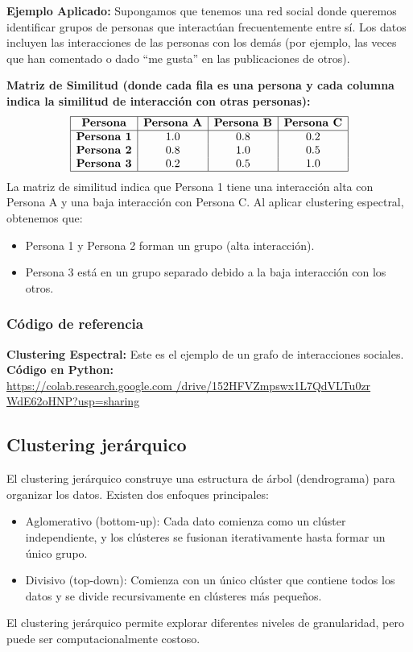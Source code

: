 \documentclass[12pt]{book}
\begin{document}
	\textbf{Ejemplo Aplicado:}
	Supongamos que tenemos una red social donde queremos identificar grupos de personas que interactúan frecuentemente entre sí. Los datos incluyen las interacciones de las personas con los demás (por ejemplo, las veces que han comentado o dado “me gusta” en las publicaciones de otros).
	
	\textbf{Matriz de Similitud (donde cada fila es una persona y cada columna indica la similitud de interacción con otras personas):}
	\[
	\begin{array}{|c|c|c|c|}
		\hline
		\textbf{Persona} & \textbf{Persona A} & \textbf{Persona B} & \textbf{Persona C} \\
		\hline
		\textbf{Persona 1} & 1.0 & 0.8 & 0.2 \\
		\textbf{Persona 2} & 0.8 & 1.0 & 0.5 \\
		\textbf{Persona 3} & 0.2 & 0.5 & 1.0 \\
		\hline
	\end{array}
	\]
	La matriz de similitud indica que Persona 1 tiene una interacción alta con Persona A y una baja interacción con Persona C. Al aplicar clustering espectral, obtenemos que:
	\begin{itemize}
		\item Persona 1 y Persona 2 forman un grupo (alta interacción).
		\item Persona 3 está en un grupo separado debido a la baja interacción con los otros.
	\end{itemize}
	\subsubsection*{Código de referencia}
	\textbf{Clustering Espectral:} Este es el ejemplo de un grafo de interacciones sociales. \\
	\textbf{Código en Python:} \\ \url{https://colab.research.google.com
		/drive/152HFVZmpswx1L7QdVLTu0zr
		WdE62oHNP?usp=sharing}
	
	\subsection{Clustering jerárquico}
	El clustering jerárquico construye una estructura de árbol (dendrograma) para organizar los datos. Existen dos enfoques principales: 
	\begin{itemize}
		\item Aglomerativo (bottom-up): Cada dato comienza como un clúster independiente, y los clústeres se fusionan iterativamente hasta formar un único grupo.
		\item Divisivo (top-down): Comienza con un único clúster que contiene todos los datos y se divide recursivamente en clústeres más pequeños.
	\end{itemize}
	El clustering jerárquico permite explorar diferentes niveles de granularidad, pero puede ser computacionalmente costoso.
	
\end{document}
